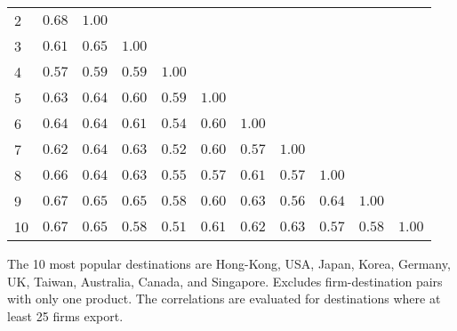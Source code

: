 \documentclass{article}
\begin{document}
\begin{table}[h]
{\begin{threeparttable}
\begin{tabular}{lrrrrrrrrrr}
2 & $0.68$   & $1.00$     &             &             &              &            &               &            &             &                        \\  
3 & $0.61$   & $0.65$     & $1.00$    &             &              &            &               &            &             &                        \\  
4 & $0.57$   & $0.59$     & $0.59$    &  $1.00$   &              &            &               &            &             &                         \\  
5 & $0.63$   & $0.64$     & $0.60$    &  $0.59$   & $1.00$     &            &               &            &             &                         \\  
6 & $0.64$   & $0.64$     & $0.61$    &  $0.54$   & $0.60$     &  $1.00$  &               &            &             &                         \\  
7 & $0.62$   & $0.64$     & $0.63$    &  $0.52$   & $0.60$     &  $0.57$  &  $1.00$     &            &             &                         \\  
8 & $0.66$   & $0.64$     & $0.63$    &  $0.55$   & $0.57$     &  $0.61$  &  $0.57$     & $1.00$   &             &                         \\  
9 & $0.67$   & $0.65$     & $0.65$    &  $0.58$   & $0.60$     &  $0.63$  &  $0.56$     & $0.64$   & $1.00$    &                         \\  
10 & $0.67$ & $0.65$    & $0.58$   &  $0.51$  & $0.61$    &  $0.62$ &  $0.63$    & $0.57$  & $0.58$   & $1.00$ \\  
\hline
\end{tabular}
\begin{tablenotes}
\small
\item  \noindent  \footnotesize{The 10 most popular destinations are Hong-Kong, USA, Japan, Korea, Germany, UK, Taiwan, Australia, Canada, and Singapore. Excludes firm-destination pairs with only one product. The correlations are evaluated for destinations where at least 25 firms export.}
\end{tablenotes}
\end{threeparttable}
}
\end{table}
\end{document}
